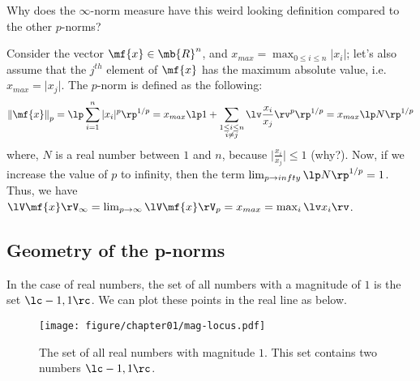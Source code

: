 \begin{boxedstuff}
    \begin{problem}
        Why does the $\infty$-norm measure have this weird looking definition compared to the other $p$-norms?
        \begin{solution}
            Consider the vector $\mf{x} \in \mb{R}^n$, and $x_{max} = \max_{0 \leq i \leq n} \vert x_i \vert$; let's also assume that the $j^{th}$ element of $\mf{x}$ has the maximum absolute value, i.e. $x_{max} = \vert x_j \vert$. The $p$-norm is defined as the following:
            \[ \begin{split} 
                \norm{\mf{x}}_p &= \lp \sum_{i=1}^{n} \vert x_i \vert^p \rp^{1/p} = x_{max} \lp 1 + \sum_{\substack{1 \leq i \leq n \\ i \neq j}} \lv \frac{x_i}{x_j} \rv^p \rp^{1/p} = x_{max}\lp N \rp^{1/p}\\
            \end{split}
            \]
            where, $N$ is a real number between $1$ and $n$, because $\vert \frac{x_i}{x_j} \vert \leq 1$ (why?). Now, if we increase the value of $p$ to infinity, then the term $\lim_{p \to infty} \lp N \rp^{1/p}= 1$. Thus, we have $\lV \mf{x} \rV_{\infty} = \lim_{p \to \infty} \lV \mf{x} \rV_p = x_{max} = \max_{i} \lv x_i \rv$.
        \end{solution}
    \end{problem}
\end{boxedstuff}

\subsection{Geometry of the p-norms}
In the case of real numbers, the set of all numbers with a magnitude of $1$ is the set $\lc -1, 1 \rc$. We can plot these points in the real line as below.

\begin{figure}[h]
    \centering
    \texttt{[image: figure/chapter01/mag-locus.pdf]}
    \caption{The set of all real numbers with magnitude $1$. This set contains two numbers $\lc -1, 1 \rc$.}
    \label{fig:ch01-real-line-1-norm}
\end{figure}

